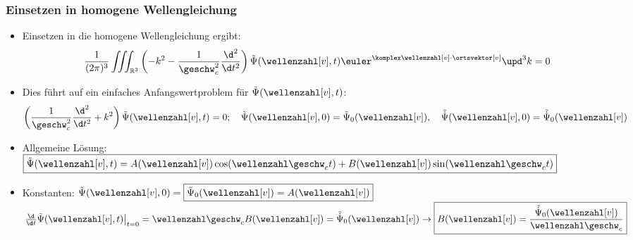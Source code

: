  \begin{frame}
  \frametitle{Einsetzen in homogene Wellengleichung}
  \begin{itemize}[<+->]
  \item Einsetzen in die homogene Wellengleichung ergibt:
    \begin{equation*}
      \frac{1}{(2\pi)^3}\iiint_{\mathbb{R}^3} \left(-k^2 -\frac{1}{\geschw_c^2}\frac{\d^2}{\d t^2}\right)\tilde{\Psi} (\wellenzahl[v], t) \euler^{\komplex \wellenzahl[v]\cdot\ortsvektor[v]} \upd^3 k = 0 
    \end{equation*}
  \item Dies führt auf ein einfaches Anfangswertproblem für \(\tilde{\Psi} (\wellenzahl[v], t)\):
    \begin{equation*}
      \left(\frac{1}{\geschw_c^2}\frac{\d^2}{\d t^2} + k^2 \right)\tilde{\Psi} (\wellenzahl[v], t) =0 ; \quad \tilde{\Psi}(\wellenzahl[v], 0) = \tilde{\Psi}_0(\wellenzahl[v]), \quad \tilde{\dot{\Psi}}(\wellenzahl[v], 0) = \tilde{\dot{\Psi}}_0(\wellenzahl[v])
    \end{equation*}
    \item Allgemeine Lösung: \(\boxed{\tilde{\Psi} (\wellenzahl[v], t) = A(\wellenzahl[v]) \cos(\wellenzahl\geschw_ct) + B(\wellenzahl[v]) \sin(\wellenzahl\geschw_ct)}\)
    \item Konstanten: \( \tilde{\Psi}(\wellenzahl[v], 0) = \boxed{\tilde{\Psi}_0(\wellenzahl[v]) = A(\wellenzahl[v])}\) \\
      \( \left. \frac{\d}{\d t} \tilde{\Psi}(\wellenzahl[v], t)\right|_{t=0}  = \wellenzahl\geschw_c B(\wellenzahl[v]) = \tilde{\dot{\Psi}}_0(\wellenzahl[v]) \to \boxed{B(\wellenzahl[v]) = \frac{\tilde{\dot{\Psi}}_0(\wellenzahl[v])}{\wellenzahl\geschw_c}}\)
    \end{itemize}
  \end{frame}

